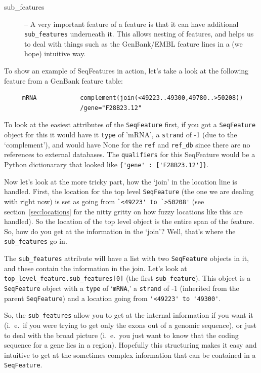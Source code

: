 \documentclass{report}
\begin{document}
\begin{description}
  \item[sub\_features] -- A very important feature of a feature is that it can have additional \verb|sub_features| underneath it. This allows nesting of features, and helps us to deal with things such as the GenBank/EMBL feature lines in a (we hope) intuitive way.
  
\end{description}

To show an example of SeqFeatures in action, let's take a look at the following feature from a GenBank feature table:

\begin{verbatim}
     mRNA            complement(join(<49223..49300,49780..>50208))
                     /gene="F28B23.12"
\end{verbatim}

To look at the easiest attributes of the \verb|SeqFeature| first, if you got a \verb|SeqFeature| object for this it would have it \verb|type| of 'mRNA', a \verb|strand| of -1 (due to the `complement'), and would have None for the \verb|ref| and \verb|ref_db| since there are no references to external databases. The \verb|qualifiers| for this SeqFeature would be a Python dictionarary that looked like \verb|{'gene' : ['F28B23.12']}|.

Now let's look at the more tricky part, how the `join' in the location
line is handled. First, the location for the top level \verb|SeqFeature| (the
one we are dealing with right now) is set as going from
\verb|`<49223' to `>50208'| (see section~\ref{sec:locations} for
the nitty gritty on how fuzzy locations like this are handled).
So the location of the top level object is the entire span of the
feature. So, how do you get at the information in the `join'?
Well, that's where the \verb|sub_features| go in.

The \verb|sub_features| attribute will have a list with two \verb|SeqFeature|
objects in it, and these contain the information in the join. Let's
look at \verb|top_level_feature.sub_features[0]| (the first
\verb|sub_feature|). This object is a \verb|SeqFeature| object with a
\verb|type| of `\verb|mRNA|,' a \verb|strand| of -1 (inherited
from the parent \verb|SeqFeature|) and a location going from
\verb|'<49223' to '49300'|.

So, the \verb|sub_features| allow you to get at the internal information if you want it (i.~e.~if you were trying to get only the exons out of a genomic sequence), or just to deal with the broad picture (i.~e.~you just want to know that the coding sequence for a gene lies in a region). Hopefully this structuring makes it easy and intuitive to get at the sometimes complex information that can be contained in a \verb|SeqFeature|.
\end{document}
